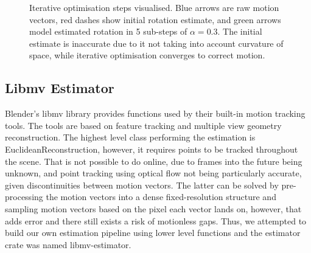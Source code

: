 \documentclass[11pt,english]{report}
\begin{document}
\begin{figure}[!ht]
	\centering
	\caption{\centering Iterative optimisation steps visualised. Blue arrows are raw motion vectors, red dashes show initial rotation estimate, and green arrows model estimated rotation in 5 sub-steps of $\alpha = 0.3$. The initial estimate is inaccurate due to it not taking into account curvature of space, while iterative optimisation converges to correct motion.}
\end{figure}

\subsection{Libmv Estimator}

Blender's libmv library provides functions used by their built-in motion tracking tools\cite{blender-motion-tracking}. The tools are based on feature tracking and multiple view geometry reconstruction. The highest level class performing the estimation is EuclideanReconstruction, however, it requires points to be tracked throughout the scene. That is not possible to do online, due to frames into the future being unknown, and point tracking using optical flow not being particularly accurate, given discontinuities between motion vectors. The latter can be solved by pre-processing the motion vectors into a dense fixed-resolution structure and sampling motion vectors based on the pixel each vector lands on, however, that adds error and there still exists a risk of motionless gaps. Thus, we attempted to build our own estimation pipeline using lower level functions and the estimator crate was named libmv-estimator.
\end{document}
